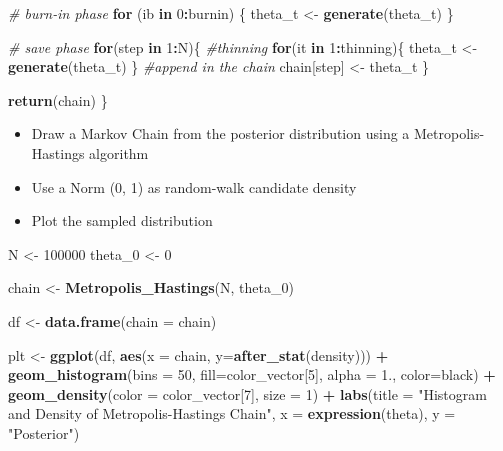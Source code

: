 \documentclass[
]{article}
\newenvironment{Shaded}{\begin{snugshade}}{\end{snugshade}}
\newcommand{\AttributeTok}[1]{\textcolor[rgb]{0.13,0.29,0.53}{#1}}
\newcommand{\CommentTok}[1]{\textcolor[rgb]{0.56,0.35,0.01}{\textit{#1}}}
\newcommand{\ControlFlowTok}[1]{\textcolor[rgb]{0.13,0.29,0.53}{\textbf{#1}}}
\newcommand{\DecValTok}[1]{\textcolor[rgb]{0.00,0.00,0.81}{#1}}
\newcommand{\FloatTok}[1]{\textcolor[rgb]{0.00,0.00,0.81}{#1}}
\newcommand{\FunctionTok}[1]{\textcolor[rgb]{0.13,0.29,0.53}{\textbf{#1}}}
\newcommand{\NormalTok}[1]{#1}
\newcommand{\OtherTok}[1]{\textcolor[rgb]{0.56,0.35,0.01}{#1}}
\newcommand{\SpecialCharTok}[1]{\textcolor[rgb]{0.81,0.36,0.00}{\textbf{#1}}}
\newcommand{\StringTok}[1]{\textcolor[rgb]{0.31,0.60,0.02}{#1}}
\begin{document}
\begin{Shaded}
\begin{Highlighting}[]
  \CommentTok{\# burn{-}in phase}
  \ControlFlowTok{for}\NormalTok{ (ib }\ControlFlowTok{in} \DecValTok{0}\SpecialCharTok{:}\NormalTok{burnin) \{}
\NormalTok{      theta\_t }\OtherTok{\textless{}{-}} \FunctionTok{generate}\NormalTok{(theta\_t)}
\NormalTok{  \}}
  
  \CommentTok{\# save phase}
  \ControlFlowTok{for}\NormalTok{(step }\ControlFlowTok{in} \DecValTok{1}\SpecialCharTok{:}\NormalTok{N)\{}
    \CommentTok{\#thinning}
    \ControlFlowTok{for}\NormalTok{(it }\ControlFlowTok{in} \DecValTok{1}\SpecialCharTok{:}\NormalTok{thinning)\{}
\NormalTok{      theta\_t }\OtherTok{\textless{}{-}} \FunctionTok{generate}\NormalTok{(theta\_t)}
\NormalTok{    \}}
    \CommentTok{\#append in the chain}
\NormalTok{    chain[step] }\OtherTok{\textless{}{-}}\NormalTok{ theta\_t}
\NormalTok{  \}}
  
  \FunctionTok{return}\NormalTok{(chain)}
\NormalTok{\}}
\end{Highlighting}
\end{Shaded}

\begin{itemize}
\item
  Draw a Markov Chain from the posterior distribution using a
  Metropolis-Hastings algorithm
\item
  Use a Norm (0, 1) as random-walk candidate density
\item
  Plot the sampled distribution
\end{itemize}

\begin{Shaded}
\begin{Highlighting}[]
\NormalTok{N }\OtherTok{\textless{}{-}} \DecValTok{100000}
\NormalTok{theta\_0 }\OtherTok{\textless{}{-}} \DecValTok{0}

\NormalTok{chain }\OtherTok{\textless{}{-}} \FunctionTok{Metropolis\_Hastings}\NormalTok{(N, theta\_0)}

\NormalTok{df }\OtherTok{\textless{}{-}} \FunctionTok{data.frame}\NormalTok{(}\AttributeTok{chain =}\NormalTok{ chain)}

\NormalTok{plt }\OtherTok{\textless{}{-}} \FunctionTok{ggplot}\NormalTok{(df, }\FunctionTok{aes}\NormalTok{(}\AttributeTok{x =}\NormalTok{ chain, }\AttributeTok{y=}\FunctionTok{after\_stat}\NormalTok{(density))) }\SpecialCharTok{+}
  \FunctionTok{geom\_histogram}\NormalTok{(}\AttributeTok{bins =} \DecValTok{50}\NormalTok{, }\AttributeTok{fill=}\NormalTok{color\_vector[}\DecValTok{5}\NormalTok{], }\AttributeTok{alpha =} \FloatTok{1.}\NormalTok{, }\AttributeTok{color=}\StringTok{\textquotesingle{}black\textquotesingle{}}\NormalTok{) }\SpecialCharTok{+}
  \FunctionTok{geom\_density}\NormalTok{(}\AttributeTok{color =}\NormalTok{ color\_vector[}\DecValTok{7}\NormalTok{], }\AttributeTok{size =} \DecValTok{1}\NormalTok{) }\SpecialCharTok{+}
  \FunctionTok{labs}\NormalTok{(}\AttributeTok{title =} \StringTok{"Histogram and Density of Metropolis{-}Hastings Chain"}\NormalTok{, }\AttributeTok{x =} \FunctionTok{expression}\NormalTok{(theta), }\AttributeTok{y =} \StringTok{"Posterior"}\NormalTok{)}
\end{Highlighting}
\end{Shaded}
\end{document}
